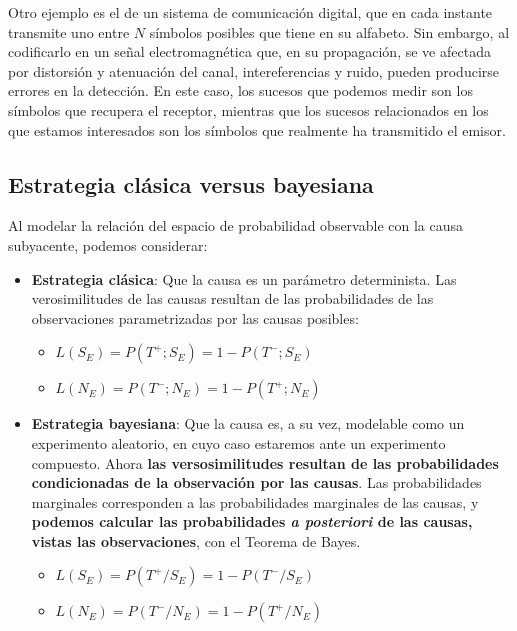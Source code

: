 \documentclass[11pt]{article}
\begin{document}
Otro ejemplo es el de un sistema de comunicación digital, que en cada
instante transmite uno entre \(N\) símbolos posibles que tiene en su
alfabeto. Sin embargo, al codificarlo en un señal electromagnética que,
en su propagación, se ve afectada por distorsión y atenuación del canal,
intereferencias y ruido, pueden producirse errores en la detección. En
este caso, los sucesos que podemos medir son los símbolos que recupera
el receptor, mientras que los sucesos relacionados en los que estamos
interesados son los símbolos que realmente ha transmitido el emisor.

    \subsection*{Estrategia clásica versus
bayesiana}\label{estrategia-cluxe1sica-versus-bayesiana}

Al modelar la relación del espacio de probabilidad observable con la
causa subyacente, podemos considerar: 
\begin{itemize}
\item \textbf{Estrategia clásica}: Que
la causa es un parámetro determinista. Las verosimilitudes de las causas
resultan de las probabilidades de las observaciones parametrizadas por
las causas posibles: 
\begin{itemize}
\item \(L(S_E)=P(T^+; S_E)=1-P(T^-; S_E)\) 
\item \(L(N_E)=P(T^-; N_E) = 1-P(T^+; N_E)\) 
\end{itemize}
\item \textbf{Estrategia bayesiana}:
Que la causa es, a su vez, modelable como un experimento aleatorio, en
cuyo caso estaremos ante un experimento compuesto. Ahora \textbf{las
versosimilitudes resultan de las probabilidades condicionadas de la
observación por las causas}. Las probabilidades marginales corresponden
a las probabilidades marginales de las causas, y \textbf{podemos
calcular las probabilidades \emph{a posteriori} de las causas, vistas
las observaciones}, con el Teorema de Bayes. 
\begin{itemize}
\item \(L(S_E)=P(T^+/ S_E)=1-P(T^-/ S_E)\) 
\item \(L(N_E)=P(T^-/ N_E) = 1-P(T^+/ N_E)\)
\end{itemize}
\end{itemize}
\end{document}
